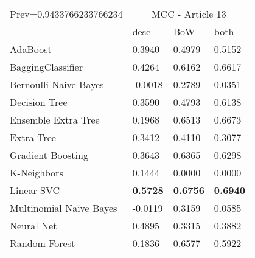 \begin{tabular}{|l|l|l|l| }
\hline
Prev=0.9433766233766234 &  \multicolumn{3}{c|}{MCC - Article 13} \\
\cline{2-4} & desc & BoW & both \\ \hline
AdaBoost                & 0.3940 & 0.4979 & 0.5152\\
BaggingClassifier       & 0.4264 & 0.6162 & 0.6617\\
Bernoulli Naive Bayes   & -0.0018 & 0.2789 & 0.0351\\
Decision Tree           & 0.3590 & 0.4793 & 0.6138\\
Ensemble Extra Tree     & 0.1968 & 0.6513 & 0.6673\\
Extra Tree              & 0.3412 & 0.4110 & 0.3077\\
Gradient Boosting       & 0.3643 & 0.6365 & 0.6298\\
K-Neighbors             & 0.1444 & 0.0000 & 0.0000\\
Linear SVC              & {\bf 0.5728} & {\bf 0.6756} & {\bf 0.6940}\\
Multinomial Naive Bayes & -0.0119 & 0.3159 & 0.0585\\
Neural Net              & 0.4895 & 0.3315 & 0.3882\\
Random Forest           & 0.1836 & 0.6577 & 0.5922\\
\hline
\end{tabular}